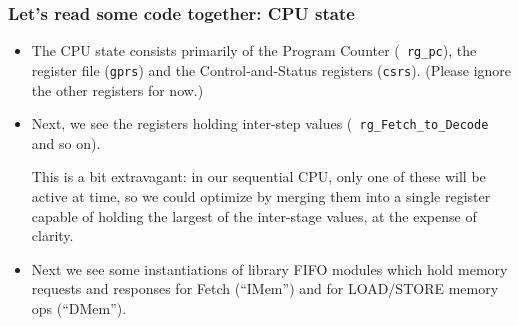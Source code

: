 \begin{frame}[fragile]
\frametitle{Let's read some code together: {\DRUM} CPU state}

\begin{center}\scriptsize


 \vspace*{5ex}

 \begin{minipage}{0.8\textwidth}
  \begin{itemize}

   \item The CPU state consists primarily of the Program Counter ({\tt
     rg\_pc}), the register file ({\tt gprs}) and the
     Control-and-Status registers ({\tt csrs}).  (Please ignore the
     other registers for now.)

   \vspace*{1ex}

   \item Next, we see the registers holding inter-step values ({\tt
    rg\_Fetch\_to\_Decode} and so on).

    \vspace*{1ex}

    \hm
    \begin{minipage}{0.8\textwidth}
      {\tiny This is a bit extravagant: in our sequential CPU, only
      one of these will be active at time, so we could optimize by
      merging them into a single register capable of holding the
      largest of the inter-stage values, at the expense of clarity.}
    \end{minipage}

   \vspace*{1ex}

   \item Next we see some instantiations of {\BSV} library FIFO
     modules which hold memory requests and responses for Fetch
     (``IMem'') and for LOAD/STORE memory ops (``DMem'').

    \vspace*{1ex}


\end{itemize}
\end{minipage}
\end{center}
\end{frame}
